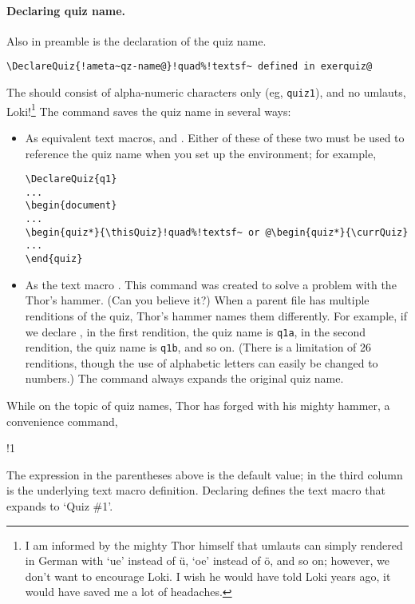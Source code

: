 \documentclass{article}
\def\FmtMP#1{\marginpar{\small\itshape\raggedleft#1}}
\edef\amtIndent{\the\parindent}
\begin{document}
\paragraph*{Declaring quiz name.} Also in preamble is the declaration of the quiz name.
\begin{Verbatim}[xleftmargin=\amtIndent,commandchars={!~@}]
\DeclareQuiz{!ameta~qz-name@}!quad%!textsf~ defined in exerquiz@
\end{Verbatim}
The  should consist of alpha-numeric characters only (eg,
\texttt{quiz1}), and no umlauts, Loki!\footnote{I am informed by the mighty
Thor himself that umlauts can simply rendered in German with `ue' instead of
\"{u}, `oe' instead of \"{o}, and so on; however, we don't want to encourage
Loki. I wish he would have told Loki years ago, it would have saved me a lot
of headaches.} The command saves the quiz name in several ways:
\begin{itemize}
    \item As equivalent text macros,  and . Either of these
    of these two must be used to reference the quiz name when you set up the 
    environment; for example,
\begin{Verbatim}[fontsize=\small,commandchars={!~@}]
\DeclareQuiz{q1}
...
\begin{document}
...
\begin{quiz*}{\thisQuiz}!quad%!textsf~ or @\begin{quiz*}{\currQuiz}
...
\end{quiz}
\end{Verbatim}
    \item As the text macro \FmtMP{\cs{thQuizName}}. This
        command was created to solve a problem with the Thor's hammer. (Can
        you believe it?)  When a parent file has multiple renditions of the
        quiz, Thor's hammer names them differently. For example, if we
        declare , in the first rendition, the quiz
        name is \texttt{q1a}, in the second rendition, the quiz name is
        \texttt{q1b}, and so on. (There is a limitation of 26 renditions,
        though the use of alphabetic letters can easily be changed to
        numbers.) The command  always expands the original
        quiz name.
\end{itemize}
While on the topic of quiz names, Thor has forged with his mighty hammer, a
convenience command,
\bVerb\small{}%
%
\edef\x{\the\eflength}%
\setlength{\eflength}{\bxSize}%
\def\1{\rlap{\hskip\eflength\rlap{\hskip\x\relax\qquad\cs{def}\cs{thqzname\darg{\ameta{text}}}}\sffamily(\cs{theQuizName})}}
\begin{dCmd}[fontsize=\small,commandchars=!()]{\bxSize}
!1
\end{dCmd}
\eVerb The expression in the parentheses above is the default value; in the third column is the underlying
text macro definition. Declaring  defines the text macro  that
expands to `Quiz \#1'.
\end{document}
